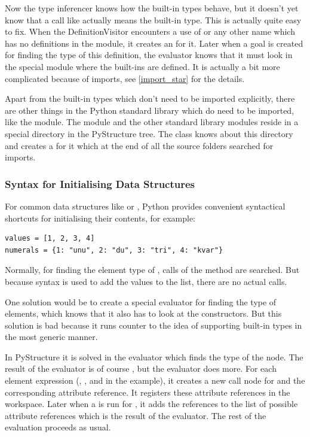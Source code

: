 \documentclass[12pt,halfparskip]{scrreprt}
\begin{document}
Now the type inferencer knows how the built-in types behave, but it doesn't yet know that a call like  actually means the built-in type. This is actually quite easy to fix. When the DefinitionVisitor encounters a use of  or any other name which has no definitions in the module, it creates an  for it. Later when a goal is created for finding the type of this definition, the evaluator knows that it must look in the special module  where the built-ins are defined. It is actually a bit more complicated because of  imports, see \vref{import_star} for the details.

Apart from the built-in types which don't need to be imported explicitly, there are other things in the Python standard library which do need to be imported, like the  module. The  module and the other standard library modules reside in a special directory in the PyStructure tree. The  class knows about this directory and creates a  for it which at the end of all the source folders searched for imports.

\subsubsection{Syntax for Initialising Data Structures}

For common data structures like  or , Python provides convenient syntactical shortcuts for initialising their contents, for example:

\begin{lstlisting}
values = [1, 2, 3, 4]
numerals = {1: "unu", 2: "du", 3: "tri", 4: "kvar"}
\end{lstlisting}

Normally, for finding the element type of , calls of the method  are searched. But because syntax is used to add the values to the list, there are no actual  calls.

One solution would be to create a special evaluator for finding the type of  elements, which knows that it also has to look at the constructors. But this solution is bad because it runs counter to the idea of supporting built-in types in the most generic manner.

In PyStructure it is solved in the evaluator which finds the type of the  node. The result of the evaluator is of course , but the evaluator does more. For each element expression (, ,  and  in the example), it creates a new call node for  and the corresponding attribute reference. It registers these attribute references in the workspace. Later when a  is run for , it adds the references to the list of possible attribute references which is the result of the evaluator. The rest of the evaluation proceeds as usual.
\end{document}
